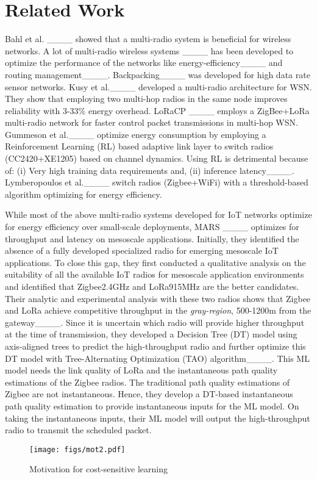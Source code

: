 \section{Related Work}
\label{sec:related_work}

Bahl et al. ____ showed that a multi-radio system is beneficial for wireless networks. A lot of multi-radio wireless systems ____ has been developed to optimize the performance of the networks like energy-efficiency____ and routing management____. Backpacking____ was developed for high data rate sensor networks. Kusy et al.____ developed a multi-radio architecture for WSN. They show that employing two multi-hop radios in the same node improves reliability with 3-33\% energy overhead. LoRaCP ____ employs a ZigBee+LoRa multi-radio network for faster control packet transmissions in multi-hop WSN. Gummeson et al.____ optimize
energy consumption by employing a Reinforcement Learning (RL) based adaptive link layer to switch radios (CC2420+XE1205) based on channel dynamics. Using RL is detrimental because of: (i) Very high training data requirements and, (ii) inference latency____. Lymberopoulos et al.____ switch radios (Zigbee+WiFi) with a threshold-based algorithm optimizing for energy efficiency.

While most of the above multi-radio systems developed for IoT networks optimize for energy efficiency over small-scale deployments, MARS ____ optimizes for throughput and latency on mesoscale applications. Initially, they identified the absence of a fully developed specialized radio for emerging mesoscale IoT applications. To close this gap, they first conducted a qualitative analysis on the suitability of all the available IoT radios for mesoscale application environments and identified that Zigbee2.4GHz and LoRa915MHz are the better candidates. Their analytic and experimental analysis with these two radios shows that Zigbee and LoRa achieve competitive throughput in the \textit{gray-region}, 500-1200m from the gateway____. Since it is uncertain which radio will provide higher throughput at the time of transmission, they developed a Decision Tree (DT) model using axis-aligned trees to predict the high-throughput radio and further optimize this DT model with Tree-Alternating Optimization (TAO) algorithm____. This ML model needs the link quality of LoRa and the instantaneous path quality estimations of the Zigbee radios. The traditional path quality estimations of Zigbee are not instantaneous. Hence, they develop a DT-based instantaneous path quality estimation to provide instantaneous inputs for the ML model. On taking the instantaneous inputs, their ML model will output the high-throughput radio to transmit the scheduled packet.
\begin{figure}[t]
   \centering
   \texttt{[image: figs/mot2.pdf]}
        \vspace{-0.1in}
        \caption{Motivation for cost-sensitive learning}
        \label{fig:motivation}
\end{figure}
\vspace{-0.2in}